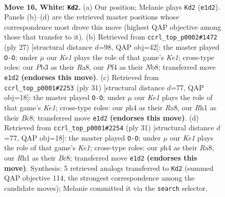 \documentclass[11pt]{article}
\begin{document}
\clearpage

\begin{figure}[p]\centering
\begin{subfigure}{0.46\textwidth}\centering
\resizebox{\linewidth}{!}{%
\newchessgame
\chessboard[
  setfen={rnbk3r/3n4/1p2p1p1/pNqpPp2/5P1p/1P5N/P1P3PP/R2QKB1R w - - 0 16},
  showmover=false,
  pgfstyle=straightmove, color=movearrow, markmove={e1-d2}
]}
\caption{}
\end{subfigure}\hfill
\begin{subfigure}{0.46\textwidth}\centering
\resizebox{\linewidth}{!}{%
\newchessgame
\chessboard[
  setfen={rn2k2r/pp2qpp1/2pb3p/3p4/3P4/1QN1P3/PP3PPP/2R1KB1R b Kkq - 3 14},
  showmover=false,
  pgfstyle=straightmove, color=movearrow, markmove={e8-g8}
]}
\caption{}
\end{subfigure}
\\[4pt]
\begin{subfigure}{0.46\textwidth}\centering
\resizebox{\linewidth}{!}{%
\newchessgame
\chessboard[
  setfen={r1b1k2r/p2n1ppp/4p3/q2pP3/1ppP1P2/8/P1QNN1PP/R3KB1R b KQkq - 1 16},
  showmover=false,
  pgfstyle=straightmove, color=movearrow, markmove={e8-g8}
]}
\caption{}
\end{subfigure}\hfill
\begin{subfigure}{0.46\textwidth}\centering
\resizebox{\linewidth}{!}{%
\newchessgame
\chessboard[
  setfen={r1b1k2r/p2n1ppp/4p3/q2pP3/1ppP1P2/8/P1QNN1PP/R3KB1R b KQkq - 1 16},
  showmover=false,
  pgfstyle=straightmove, color=movearrow, markmove={e8-g8}
]}
\caption{}
\end{subfigure}
\caption{\textbf{Move 16, White: \texttt{Kd2}.} (a) Our position; Melanie plays \texttt{Kd2} (\texttt{e1d2}). Panels (b)--(d) are the retrieved master positions whose correspondence most drove this move (highest QAP objective among those that transfer to it). (b) Retrieved from \texttt{ccrl\_top\_p0002\#1472} (ply 27) [structural distance $d$=98, QAP obj=42]: the master played \texttt{O-O}; under $\mu$ our \emph{Ke1} plays the role of that game's \emph{Ke1}; cross-type roles: our \emph{P}b3 as their \emph{R}a8, our \emph{P}f4 as their \emph{N}b8; transferred move \texttt{e1d2} \textbf{(endorses this move)}. (c) Retrieved from \texttt{ccrl\_top\_p0001\#2253} (ply 31) [structural distance $d$=77, QAP obj=18]: the master played \texttt{O-O}; under $\mu$ our \emph{Ke1} plays the role of that game's \emph{Ke1}; cross-type roles: our \emph{p}h4 as their \emph{R}a8, our \emph{R}h1 as their \emph{B}c8; transferred move \texttt{e1d2} \textbf{(endorses this move)}. (d) Retrieved from \texttt{ccrl\_top\_p0001\#2254} (ply 31) [structural distance $d$=77, QAP obj=18]: the master played \texttt{O-O}; under $\mu$ our \emph{Ke1} plays the role of that game's \emph{Ke1}; cross-type roles: our \emph{p}h4 as their \emph{R}a8, our \emph{R}h1 as their \emph{B}c8; transferred move \texttt{e1d2} \textbf{(endorses this move)}. Synthesis: 5 retrieved analogs transferred to \texttt{Kd2} (summed QAP objective 114, the strongest correspondence among the candidate moves); Melanie committed it via the \texttt{search} selector.}
\label{fig:thought-m30}
\end{figure}
\end{document}
